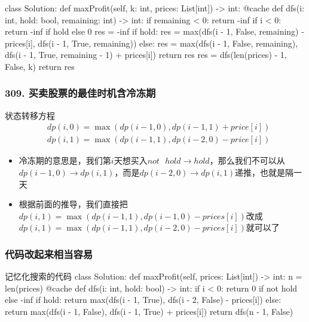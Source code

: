 \begin{frame}[fragile]
  \begin{codeblock}[language=python]{ }
class Solution:
    def maxProfit(self, k: int, prices: List[int]) -> int:
        @cache
        def dfs(i: int, hold: bool, remaining: int) -> int:
            if remaining < 0:
                return -inf
            if i < 0:
                return -inf if hold else 0
            res = -inf
            if hold:
                res = max(dfs(i - 1, False, remaining) - prices[i], dfs(i - 1, True, remaining))
            else:
                res = max(dfs(i - 1, False, remaining), dfs(i - 1, True, remaining - 1) + prices[i])
            return res
        res = dfs(len(prices) - 1, False, k)
        return res
  \end{codeblock}
\end{frame}


\begin{frame}[fragile]          %
  \frametitle{\textsc{309. 买卖股票的最佳时机含冷冻期}}
    \begin{alertblock}{状态转移方程}
    \begin{align}
      &dp(i,0)=\max(dp(i-1,0),dp(i-1,1)+price[i])\\
      &dp(i,1)=\max(dp(i-1,1),dp(i-2,0)-price[i])
    \end{align}
  \end{alertblock}
  \begin{itemize}
    \item 冷冻期的意思是，我们第$i$天想买入$not \text{ } hold \to hold$，那么我们不可以从$dp(i-1,0)\to dp(i,1)$，而是$dp(i-2,0)\to dp(i,1)$递推，也就是隔一天
    \item 根据前面的推导，我们直接把$dp(i,1)=\max(dp(i-1,1),dp(i-1,0)-prices[i])$改成$dp(i,1)=\max(dp(i-1,1),dp(i-2,0)-prices[i])$就可以了
  \end{itemize}
\end{frame}


\begin{frame}[fragile]
  \frametitle{代码改起来相当容易}
  \begin{codeblock}[language=python]{记忆化搜索的代码}
class Solution:
    def maxProfit(self, prices: List[int]) -> int:
        n = len(prices)
        @cache
        def dfs(i: int, hold: bool) -> int:
            if i < 0:
                return 0 if not hold else -inf
            if hold:
                return max(dfs(i - 1, True), dfs(i - 2, False) - prices[i])
            else:
                return max(dfs(i - 1, False), dfs(i - 1, True) + prices[i])
        return dfs(n - 1, False)
  \end{codeblock}
\end{frame}


